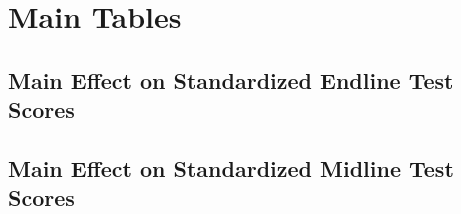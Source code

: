 \documentclass[11pt]{article}
\begin{document}
\clearpage
\section{Main Tables}

\begin{center}
{\renewcommand\normalsize{}\normalsize\singlespacing\setlength{\tabcolsep}{20pt}
} 
\end{center}


\begin{center}
{\renewcommand\normalsize{}\normalsize\singlespacing\setlength{\tabcolsep}{20pt}
} 
\end{center}

\begin{center}
{\renewcommand\normalsize{}\normalsize\singlespacing\setlength{\tabcolsep}{20pt}
} 
\end{center}

\begin{center}
{\renewcommand\normalsize{}\normalsize\singlespacing\setlength{\tabcolsep}{20pt}
} 
\end{center}

\clearpage
\subsection{Main Effect on Standardized Endline Test Scores}
\begin{center}
{\renewcommand\normalsize{}\normalsize\singlespacing\setlength{\tabcolsep}{20pt}
} 
\end{center}

\begin{center}
{\renewcommand\normalsize{}\normalsize\singlespacing\setlength{\tabcolsep}{20pt}
} 
\end{center}

\clearpage
\subsection{Main Effect on Standardized Midline Test Scores}
\begin{center}
{\renewcommand\normalsize{}\normalsize\singlespacing\setlength{\tabcolsep}{20pt}
} 
\end{center}
\end{document}
